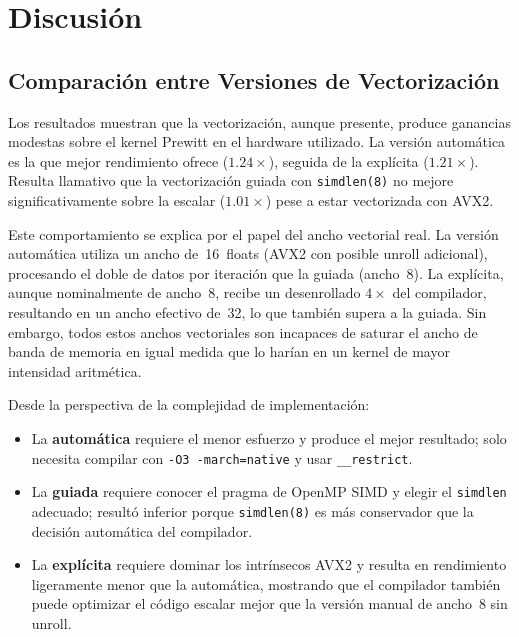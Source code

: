 \section{Discusi\'on}

\subsection{Comparaci\'on entre Versiones de Vectorizaci\'on}

Los resultados muestran que la vectorizaci\'on, aunque presente,
produce ganancias modestas sobre el kernel Prewitt en el hardware
utilizado.
La versi\'on autom\'atica es la que mejor rendimiento ofrece
($1.24\times$), seguida de la expl\'icita ($1.21\times$).
Resulta llamativo que la vectorizaci\'on guiada con
\texttt{simdlen(8)} no mejore significativamente sobre la escalar
($1.01\times$) pese a estar vectorizada con AVX2.

Este comportamiento se explica por el papel del ancho vectorial
real.
La versi\'on autom\'atica utiliza un ancho de~16~floats (AVX2
con posible unroll adicional), procesando el doble de datos por
iteraci\'on que la guiada (ancho~8).
La expl\'icita, aunque nominalmente de ancho~8, recibe un
desenrollado $4\times$ del compilador, resultando en un ancho
efectivo de~32, lo que tambi\'en supera a la guiada.
Sin embargo, todos estos anchos vectoriales son incapaces de
saturar el ancho de banda de memoria en igual medida que lo
har\'ian en un kernel de mayor intensidad aritm\'etica.

Desde la perspectiva de la complejidad de implementaci\'on:
\begin{itemize}
  \item La \textbf{autom\'atica} requiere el menor esfuerzo y
    produce el mejor resultado; solo necesita compilar con
    \texttt{-O3 -march=native} y usar \texttt{\_\_restrict}.
  \item La \textbf{guiada} requiere conocer el pragma de OpenMP
    SIMD y elegir el \texttt{simdlen} adecuado; result\'o inferior
    porque \texttt{simdlen(8)} es m\'as conservador que la
    decisi\'on autom\'atica del compilador.
  \item La \textbf{expl\'icita} requiere dominar los intr\'insecos
    AVX2 y resulta en rendimiento ligeramente menor que la
    autom\'atica, mostrando que el compilador tambi\'en puede
    optimizar el c\'odigo escalar mejor que la versi\'on manual
    de ancho~8 sin unroll.
\end{itemize}

